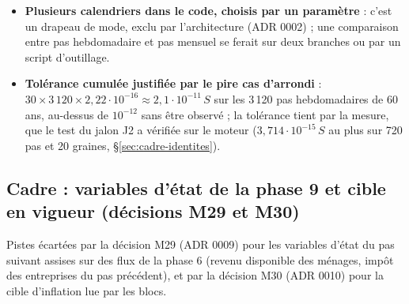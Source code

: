\documentclass[11pt,a4paper]{article}
\begin{document}
\begin{itemize}
\item \textbf{Plusieurs calendriers dans le code, choisis par un paramètre} : c'est un drapeau de mode, exclu par l'architecture (ADR 0002) ; une comparaison entre pas hebdomadaire et pas mensuel se ferait sur deux branches ou par un script d'outillage.
\item \textbf{Tolérance cumulée justifiée par le pire cas d'arrondi} : $30 \times 3\,120 \times 2{,}22 \cdot 10^{-16} \approx 2{,}1 \cdot 10^{-11}\,S$ sur les 3\,120 pas hebdomadaires de 60 ans, au-dessus de $10^{-12}$ sans être observé ; la tolérance tient par la mesure, que le test du jalon J2 a vérifiée sur le moteur ($3{,}714 \cdot 10^{-15}\,S$ au plus sur 720 pas et 20 graines, \S\ref{sec:cadre-identites}).
\end{itemize}

\subsection*{Cadre : variables d'état de la phase 9 et cible en vigueur (décisions M29 et M30)}
Pistes écartées par la décision M29 (ADR 0009) pour les variables d'état du pas suivant assises sur des flux de la phase 6 (revenu disponible des ménages, impôt des entreprises du pas précédent), et par la décision M30 (ADR 0010) pour la cible d'inflation lue par les blocs.
\end{document}
